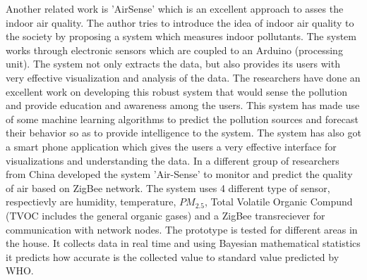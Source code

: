  Another related work is 'AirSense'\cite{Fang2016} which is an excellent approach to asses the indoor air quality. The author tries to introduce the idea of indoor air quality to the society by proposing a system which measures indoor pollutants. The system works through electronic sensors which are coupled to an Arduino (processing unit). The system not only extracts the data, but also provides its users with very effective visualization and analysis of the data. The researchers have done an excellent work on developing this robust system that would sense the pollution and provide education and awareness among the users. This system has made use of some machine learning algorithms to predict the pollution sources and forecast their behavior so as to provide intelligence to the system. 
The system has also got a smart phone application which gives the users a very effective interface for visualizations and understanding the data. In \cite{Liu2017} a different group of researchers from China developed the system 'Air-Sense' to monitor and predict the quality of air based on ZigBee network. The system uses 4 different type of sensor, respectievly are humidity, temperature, $PM_{2.5}$, Total Volatile Organic Compund (TVOC includes the general organic gases) and a ZigBee transreciever for communication with network nodes. The prototype is tested for different areas in the house. It collects data in real time and using Bayesian mathematical statistics it predicts how accurate is the collected value to standard value predicted by WHO. 
\par

